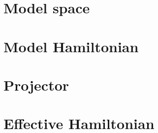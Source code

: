 \documentclass[12pt,twoside]{report}
\begin{document}
	\section{Model space}
	
	\section{Model Hamiltonian}
	
	\section{Projector}
	
	\section{Effective Hamiltonian}
	
	
\end{document}
